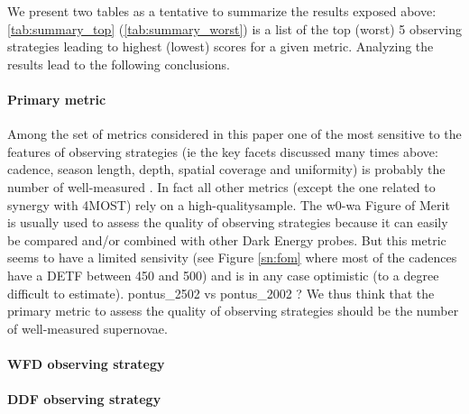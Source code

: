 We present two tables as a tentative to summarize the results exposed above: \ref{tab:summary_top} (\ref{tab:summary_worst}) is a list of the top (worst) 5 observing strategies leading to highest (lowest) scores for a given metric. Analyzing the results lead to the following conclusions.

\paragraph{Primary metric} Among the set of metrics considered in this paper one of the most sensitive to the features of observing strategies (ie the key facets discussed many times above: cadence, season length, depth, spatial coverage and uniformity) is probably the number of well-measured \sne. In fact all other metrics (except the one related to synergy with 4MOST) rely on a high-quality\sne sample. The w0-wa Figure of Merit is usually used to assess the quality of observing strategies because it can easily be compared and/or combined with other Dark Energy probes. But this metric seems to have  a limited sensivity (see Figure \ref{sn:fom} where most of the cadences have a DETF between 450 and 500) and is in any case optimistic (to a degree difficult to estimate). pontus\_2502 vs pontus\_2002 ? We thus think that the primary metric to assess the quality of observing strategies should be the number of well-measured supernovae.

\paragraph{WFD observing strategy}


\paragraph{DDF observing strategy}

